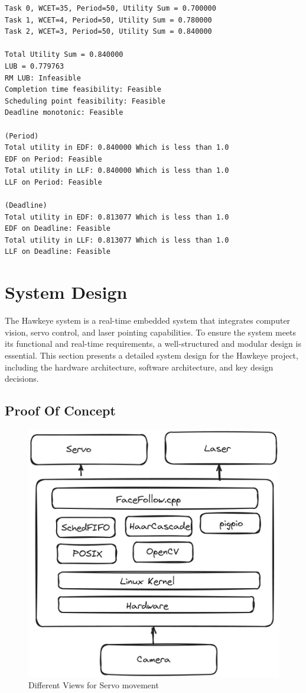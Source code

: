 \documentclass[a4paper,11pt]{article}%
\begin{document}
\begin{itemize}
\begin{lstlisting}
Task 0, WCET=35, Period=50, Utility Sum = 0.700000
Task 1, WCET=4, Period=50, Utility Sum = 0.780000
Task 2, WCET=3, Period=50, Utility Sum = 0.840000

Total Utility Sum = 0.840000
LUB = 0.779763
RM LUB: Infeasible
Completion time feasibility: Feasible
Scheduling point feasibility: Feasible
Deadline monotonic: Feasible

(Period)
Total utility in EDF: 0.840000 Which is less than 1.0 
EDF on Period: Feasible
Total utility in LLF: 0.840000 Which is less than 1.0 
LLF on Period: Feasible

(Deadline)
Total utility in EDF: 0.813077 Which is less than 1.0 
EDF on Deadline: Feasible
Total utility in LLF: 0.813077 Which is less than 1.0 
LLF on Deadline: Feasible
    \end{lstlisting}
\end{itemize}


\section{System Design}
The Hawkeye system is a real-time embedded system that integrates computer vision, servo control, and laser pointing capabilities. To ensure the system meets its functional and real-time requirements, a well-structured and modular design is essential. This section presents a detailed system design for the Hawkeye project, including the hardware architecture, software architecture, and key design decisions.

\subsection{Proof Of Concept}
\begin{figure}[H]
    \centering
    \includegraphics[scale=0.27]{figures/proof_of_concept.png}
    \caption{Different Views for Servo movement}
\end{figure}
\end{document}
